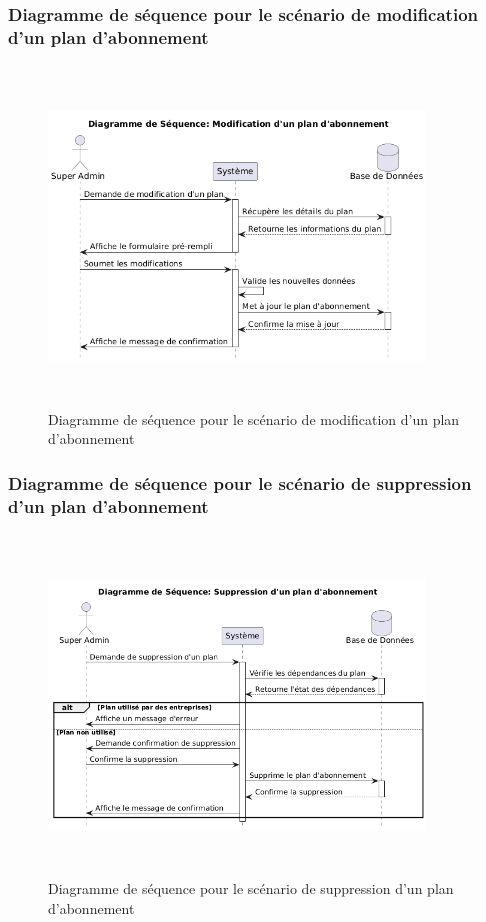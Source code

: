 \subsubsection{Diagramme de séquence pour le scénario de modification d'un plan d'abonnement}
\begin{figure}[H]
    \centering
    \includegraphics[width=10cm,height=9cm]{images/modifyplanseq.png}
    \caption{Diagramme de séquence pour le scénario de modification d'un plan d'abonnement}
\end{figure}

\subsubsection{Diagramme de séquence pour le scénario de suppression d'un plan d'abonnement}
\begin{figure}[H]
    \centering
    \includegraphics[width=10cm,height=9cm]{images/deleteplanseq.png}
    \caption{Diagramme de séquence pour le scénario de suppression d'un plan d'abonnement}
\end{figure}

